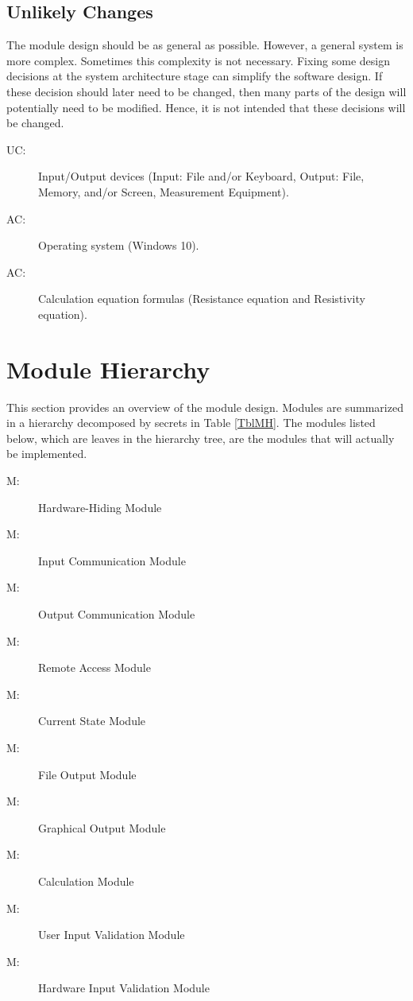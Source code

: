 \documentclass[12pt, titlepage]{article}
\newcounter{acnum}
\newcommand{\actheacnum}{AC\theacnum}
\newcounter{ucnum}
\newcommand{\uctheucnum}{UC\theucnum}
\newcounter{mnum}
\newcommand{\mthemnum}{M\themnum}
\begin{document}
\subsection{Unlikely Changes} \label{SecUchange}

The module design should be as general as possible. However, a general system is
more complex. Sometimes this complexity is not necessary. Fixing some design
decisions at the system architecture stage can simplify the software design. If
these decision should later need to be changed, then many parts of the design
will potentially need to be modified. Hence, it is not intended that these
decisions will be changed.

\begin{description}
\item[ \uctheucnum \label{ucIO}:] Input/Output devices
  (Input: File and/or Keyboard, Output: File, Memory, and/or Screen, Measurement Equipment).
\item[ \actheacnum \label{ucOS}:] Operating system (Windows 10).
\item[ \actheacnum \label{ucCalculation}:] Calculation equation formulas (Resistance equation and Resistivity equation).
\end{description}

\section{Module Hierarchy} \label{SecMH}

This section provides an overview of the module design. Modules are summarized
in a hierarchy decomposed by secrets in Table \ref{TblMH}. The modules listed
below, which are leaves in the hierarchy tree, are the modules that will
actually be implemented.

\begin{description}
\item [ \mthemnum \label{mHH}:] Hardware-Hiding Module
\item [ \mthemnum \label{mIC}:] Input Communication Module
\item [ \mthemnum \label{mOC}:] Output Communication Module
\item [ \mthemnum \label{mRA}:] Remote Access Module
\item [ \mthemnum \label{mCS}:] Current State Module
\item [ \mthemnum \label{mFO}:] File Output Module
\item [ \mthemnum \label{mGO}:] Graphical Output Module
\item [ \mthemnum \label{mC}:] Calculation Module
\item [ \mthemnum \label{mUI}:] User Input Validation Module
\item [ \mthemnum \label{mHI}:] Hardware Input Validation Module
\end{description}
\end{document}
